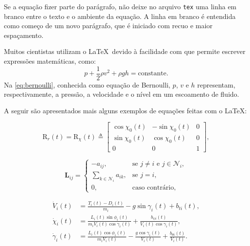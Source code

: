 Se a equação fizer parte do parágrafo, não deixe no arquivo \texttt{tex} uma linha em branco entre o texto e o ambiente da equação. A linha em branco é entendida como começo de um novo parágrafo, que é iniciado com recuo e maior espaçamento.

Muitos cientistas utilizam o \LaTeX\ devido à facilidade com que permite escrever expressões matemáticas, como:
\begin{equation}
p+\frac{1}{2}{\rho}v^2+{\rho}gh = \mathrm{constante}.
\label{eq:bernoulli}
\end{equation}
Na \cref{eq:bernoulli}, conhecida como equação de Bernoulli, $p$, $v$ e $h$ representam, respectivamente, a pressão, a velocidade e o nível em um escoamento de fluido.


A seguir são apresentados mais alguns exemplos de equações feitas com o \LaTeX:

\begin{equation}\label{eq:R_f_usual}
\bm{\mathrm{R}}_r(t) = \bm{\mathrm{R}}_{\chi}(t) \triangleq 
\begin{bmatrix}
\cos \chi_0 (t) & -\sin \chi_0 (t) & 0
\\
\sin \chi_0 (t) & \cos \chi_0 (t) & 0
\\
0 & 0 & 1
\end{bmatrix},
\end{equation}

\begin{equation}
\bm{L}_{ij} = 
\begin{cases}
-a_{ij}, & \textrm{se } j \neq i \textrm{ e } j \in \mathcal{N}_i, \\
\sum_{k \in \mathcal{N}_i} a_{ik}, & \textrm{se } j = i,  \\
0, & \textrm{caso contrário},
\end{cases}
\end{equation}

\begin{equation}\label{eq:point-mass-velocity}
\begin{split}
\dot{V}_{i}(t) &{}= \frac{T_{i}(t) - D_i(t)}{m_i} - g \sin \gamma_{i}(t) + b_{ti}(t), \\
\dot{\chi}_i(t) &{}= \frac{L_i(t) \sin \phi_i(t)}{m_i V_{i}(t) \cos \gamma_{i}(t)} + \frac{b_{\psi i}(t)}{V_{i}(t)\cos \gamma_{i}(t)}, \\
\dot{\gamma}_{i}(t) &{}= \frac{L_i(t) \cos \phi_i(t)}{m_i V_{i}(t)} - \frac{g \cos \gamma_{i}(t)}{V_{i}(t)} + \frac{b_{\theta i}(t)}{V_{i}(t)}.
\end{split}
\end{equation}


